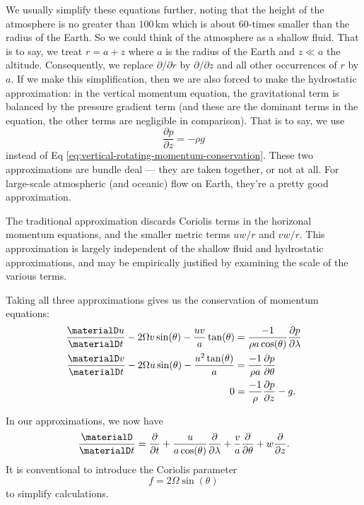 We usually simplify these equations further, noting that the height of
the atmosphere is no greater than $100\,\mathrm{km}$ which is about
60-times smaller than the radius of the Earth. So we could think of the
atmosphere as a shallow fluid. That is to say, we treat $r=a+z$ where
$a$ is the radius of the Earth and $z\ll a$ the altitude. Consequently,
we replace $\partial/\partial r$ by $\partial/\partial z$ and all other
occurrences of $r$ by $a$. If we make this simplification, then we
are also forced to make the hydrostatic approximation: in the vertical
momentum equation, the gravitational term is balanced by the pressure
gradient term (and these are the dominant terms in the equation, the
other terms are negligible in comparison). That is to say, we use
\begin{equation}
  \frac{\partial p}{\partial z}=-\rho g
\end{equation}
instead of Eq \eqref{eq:vertical-rotating-momentum-conservation}. These
two approximations are bundle deal --- they are taken together, or not
at all. For large-scale atmospheric (and oceanic) flow on Earth, they're
a pretty good approximation.

The traditional approximation discards Coriolis terms in the horizonal
momentum equations, and the smaller metric terms $uw/r$ and
$vw/r$. This approximation is largely independent of the shallow fluid
and hydrostatic approximations, and may be empirically justified by
examining the scale of the various terms.

\begin{prop}
Taking all three approximations gives us the conservation of momentum equations:
\begin{subequations}
  \begin{align}
    \frac{\materialD u}{\materialD t}
    - 2\Omega v\sin(\theta) - \frac{uv}{a}\tan(\theta)
    &= \frac{-1}{\rho a\cos(\theta)}\frac{\partial p}{\partial\lambda}\\
    \frac{\materialD v}{\materialD t}
    - 2\Omega u\sin(\theta) - \frac{u^{2}\tan(\theta)}{a}
    &= \frac{-1}{\rho a}\frac{\partial p}{\partial\theta} \\
    0 &= \frac{-1}{\rho}\frac{\partial p}{\partial z}-g.
  \end{align}
\end{subequations}
\end{prop}

\begin{note}
In our approximations, we now have
\begin{equation}
  \frac{\materialD}{\materialD t}=\frac{\partial}{\partial t} +
  \frac{u}{a\cos(\theta)}\frac{\partial}{\partial\lambda} +
  \frac{v}{a}\frac{\partial}{\partial\theta} + w\frac{\partial}{\partial z}.
\end{equation}
It is conventional to introduce the Coriolis parameter
\begin{equation}
  f = 2\Omega\sin(\theta)
\end{equation}
to simplify calculations.
\end{note}

